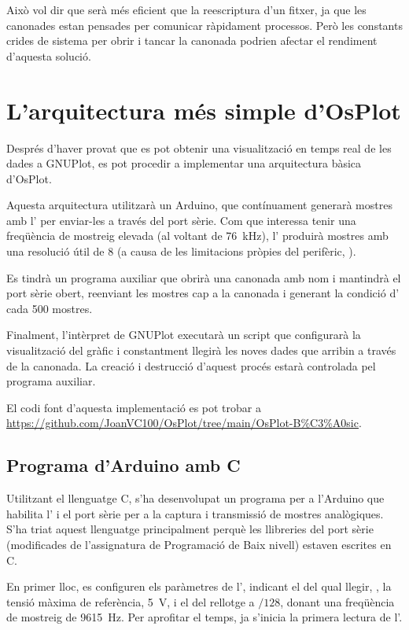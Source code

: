 \documentclass{tfgitic}[2023/06/30]
\begin{document}
Això vol dir que serà més eficient que la reescriptura d'un fitxer, ja
que les canonades estan pensades per comunicar ràpidament
processos. Però les constants crides de sistema per obrir i tancar la
canonada podrien afectar el rendiment d'aquesta solució.

\section{L'arquitectura més simple d'OsPlot}

Després d'haver provat que es pot obtenir una visualització en temps
real de les dades a GNUPlot, es pot procedir a implementar una
arquitectura bàsica d'OsPlot.

Aquesta arquitectura utilitzarà un Arduino, que contínuament generarà
mostres amb l' per enviar-les a través del port sèrie. Com
que interessa tenir una freqüència de mostreig elevada (al voltant de
\SI{76}{\kHz}), l' produirà mostres amb una resolució útil
de \SI{8}{\bits} (a causa de les limitacions pròpies del perifèric,
\cite{analisi-adc}).

Es tindrà un programa auxiliar que obrirà una canonada amb nom i
mantindrà el port sèrie obert, reenviant les mostres cap a la canonada
i generant la condició d' cada \num{500} mostres.

Finalment, l'intèrpret de GNUPlot executarà un script que configurarà
la visualització del gràfic i constantment llegirà les noves dades que
arribin a través de la canonada. La creació i destrucció d'aquest
procés estarà controlada pel programa auxiliar.

El codi font d'aquesta implementació es pot trobar a
\url{https://github.com/JoanVC100/OsPlot/tree/main/OsPlot-B%C3%A0sic}.

\subsection{Programa d'Arduino amb C}
\label{programa-arduino-c}

Utilitzant el llenguatge C, s'ha desenvolupat un programa per a
l'Arduino que habilita l' i el port sèrie per a la captura i
transmissió de mostres analògiques. S'ha triat aquest llenguatge
principalment perquè les llibreries del port sèrie (modificades de
l'assignatura de Programació de Baix nivell) estaven escrites en C.

En primer lloc, es configuren els paràmetres de l', indicant
el  del qual llegir, , la tensió màxima de
referència, \SI{5}{\V}, i el  del rellotge a $/128$,
donant una freqüència de mostreig de \SI{9615}{\Hz}. Per aprofitar el
temps, ja s'inicia la primera lectura de l'.
\end{document}

